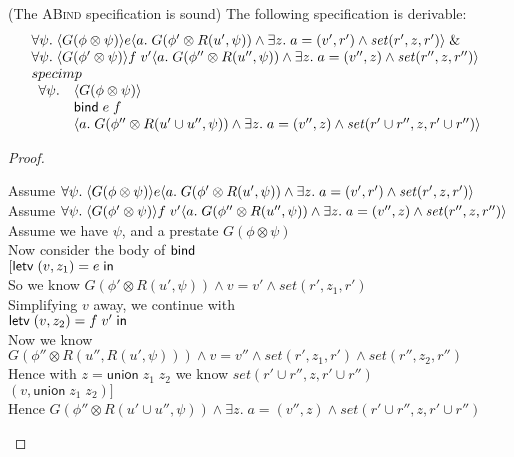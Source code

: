 \begin{prop*}{(The \textsc{ABind} specification is sound)}
The following specification is derivable:
\begin{displaymath}
\begin{array}{l}
\forall \psi.\; \langle{G(\phi \otimes \psi)}\rangle{e}\langle{a}.\;{G(\phi' \otimes R(u', \psi)) \land \exists z.\;a = (v', r') \land \mathit{set}(r', z, r')}\rangle 
                \;\&\; \\
\forall \psi.\; \langle{G(\phi' \otimes \psi)}\rangle{f\;v'}\langle{a}.\;{G(\phi'' \otimes R(u'', \psi)) \land \exists z.\; a = (v'', z) \land \mathit{set}(r'', z, r'')}\rangle\\
specimp \\
\begin{array}{ll}
     \forall \psi. & \left<G(\phi \otimes \psi)\right> \\
                   & \mathsf{bind}\; e\;f \\
                   &  \left<a.\;G(\phi'' \otimes R(u' \cup u'', \psi)) \land \exists z.\;a = (v'', z) \land \mathit{set}(r' \cup r'', z, r' \cup r'')\right> \\
   \end{array}
\end{array}
\end{displaymath}
\end{prop*}

\begin{proof}
\begin{tabbedproof}
\oo Assume $\forall \psi.\; \langle{G(\phi \otimes \psi)}\rangle{e}\langle{a}.\;{G(\phi' \otimes R(u', \psi)) \land \exists z.\;a = (v', r') \land \mathit{set}(r', z, r')}\rangle$ \\
\oo Assume $\forall \psi.\; \langle{G(\phi' \otimes \psi)}\rangle{f\;v'}\langle{a}.\;{G(\phi'' \otimes R(u'', \psi)) \land \exists z.\; a = (v'', z) \land \mathit{set}(r'', z, r'')}\rangle$ \\
\oo Assume we have $\psi$, and a prestate $G(\phi \otimes \psi)$ \\
\ooo Now consider the body of $\mathsf{bind}\;$ \\
\ooo $[\mathsf{letv}\;(v, z_1) = e\;\mathsf{in}\;$ \\
\ooo So we know $G(\phi' \otimes R(u', \psi)) \land v = v' \land \mathit{set}(r', z_1, r')$ \\
\ooo Simplifying $v$ away, we continue with \\
\ooo $\mathsf{letv}\;(v, z_2) = f\;v'\;\mathsf{in}\;$ \\
\ooo Now we know $G(\phi'' \otimes R(u'', R(u', \psi))) \land v = v'' \land \mathit{set}(r', z_1, r') \land \mathit{set}(r'', z_2, r'')$ \\
\ooo Hence with $z = \mathsf{union}\;z_1\;z_2$ we know $\mathit{set}(r' \cup r'', z, r' \cup r'')$ \\
\ooo $(v, \mathsf{union}\;z_1\;z_2)]$ \\
\ooo Hence $G(\phi'' \otimes R(u' \cup u'', \psi)) \land \exists z.\; a = (v'', z) \land \mathit{set}(r' \cup r'', z, r' \cup r'')$ 
\end{tabbedproof}
\end{proof}

